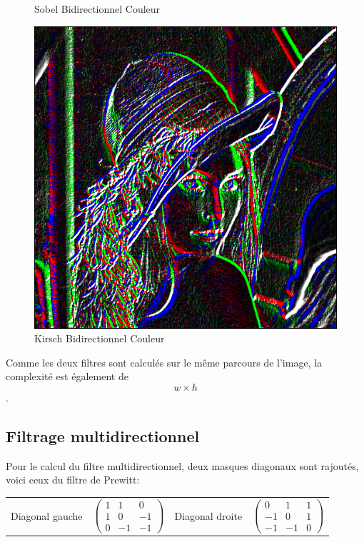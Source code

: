 \documentclass[11pt]{article}
\begin{document}
\begin{figure}[H]
\begin{minipage}[c]{.3\linewidth}
			\caption{Sobel Bidirectionnel Couleur}
			\label{fig:SobelBidirectionnelCouleur}
		\end{minipage}\hfill
		\begin{minipage}[c]{.3\linewidth}
		\centering
		\includegraphics[scale=0.25]{Image/filtreKirschBidirectionnelCouleur.png}
		\caption{Kirsch Bidirectionnel Couleur}
		\label{fig:KirschBidirectionnelCouleur}
		\end{minipage}
	\end{figure}


	Comme les deux filtres sont calculés sur le même parcours de l'image, la complexité est également de \[w \times h\].

	\subsection{Filtrage multidirectionnel}

	Pour le calcul du filtre multidirectionnel, deux masques diagonaux sont rajoutés, voici ceux du filtre de Prewitt:
	\\
	\begin{tabular}{cccc}
		Diagonal gauche &
		$
		\begin{pmatrix}
			1 & 1 & 0 \\
			1 & 0 & -1 \\
			0 & -1 & -1
		\end{pmatrix}
		$
		& Diagonal droite &
		$
		\begin{pmatrix}
		0 & 1 & 1 \\
		-1 & 0 & 1 \\
		-1 & -1 & 0
		\end{pmatrix}
		$
	\end{tabular}
\end{document}
